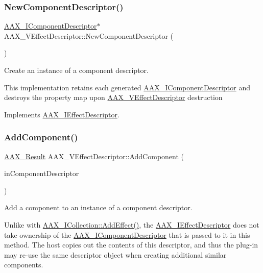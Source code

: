 \subsubsection{\texorpdfstring{NewComponentDescriptor()}{NewComponentDescriptor()}}
{\footnotesize\ttfamily \mbox{\hyperlink{a01781}{A\+A\+X\+\_\+\+I\+Component\+Descriptor}}$\ast$ A\+A\+X\+\_\+\+V\+Effect\+Descriptor\+::\+New\+Component\+Descriptor (\begin{DoxyParamCaption}{ }\end{DoxyParamCaption})\hspace{0.3cm}{\ttfamily [virtual]}}



Create an instance of a component descriptor. 

This implementation retains each generated \mbox{\hyperlink{a01781}{A\+A\+X\+\_\+\+I\+Component\+Descriptor}} and destroys the property map upon \mbox{\hyperlink{a01913}{A\+A\+X\+\_\+\+V\+Effect\+Descriptor}} destruction 

Implements \mbox{\hyperlink{a01813_a2102ea4391f5b60e4d5e860a997383e4}{A\+A\+X\+\_\+\+I\+Effect\+Descriptor}}.

\mbox{\label{a01913_ab64b449fc1176f1d4e782b3fa307ad1f}} 
\subsubsection{\texorpdfstring{AddComponent()}{AddComponent()}}
{\footnotesize\ttfamily \mbox{\hyperlink{a00392_a4d8f69a697df7f70c3a8e9b8ee130d2f}{A\+A\+X\+\_\+\+Result}} A\+A\+X\+\_\+\+V\+Effect\+Descriptor\+::\+Add\+Component (\begin{DoxyParamCaption}\item[{\mbox{\hyperlink{a01781}{A\+A\+X\+\_\+\+I\+Component\+Descriptor}} $\ast$}]{in\+Component\+Descriptor }\end{DoxyParamCaption})\hspace{0.3cm}{\ttfamily [virtual]}}



Add a component to an instance of a component descriptor. 

Unlike with \mbox{\hyperlink{a01777_a5ff114b8c4da2081515186f2faf65c8c}{A\+A\+X\+\_\+\+I\+Collection\+::\+Add\+Effect()}}, the \mbox{\hyperlink{a01813}{A\+A\+X\+\_\+\+I\+Effect\+Descriptor}} does not take ownership of the \mbox{\hyperlink{a01781}{A\+A\+X\+\_\+\+I\+Component\+Descriptor}} that is passed to it in this method. The host copies out the contents of this descriptor, and thus the plug-\/in may re-\/use the same descriptor object when creating additional similar components.


